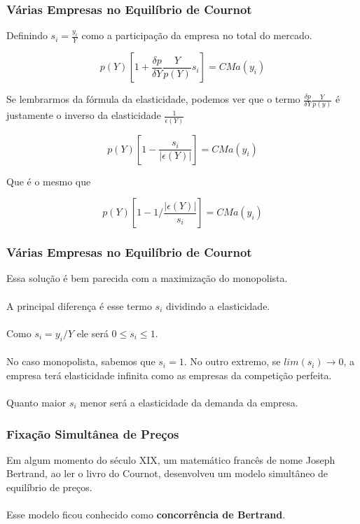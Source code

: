 \documentclass{beamer}[10]
\begin{document}
\begin{frame}
	\frametitle{Várias Empresas no Equilíbrio de Cournot}

	Definindo $s_i = \frac{y_i}{Y}$ como a participação da empresa no total do mercado.

	$$ p(Y) \left[1 + \frac{\delta p}{\delta Y} \frac{Y}{p(Y)} s_i \right] = CMa(y_i) $$

	Se lembrarmos da fórmula da elasticidade, podemos ver que o termo $\frac{\delta p}{\delta Y} \frac{Y}{p(y)}$ é justamente o inverso da elasticidade $\frac{1}{\epsilon(Y)}$

	$$ p(Y) \left[1 - \frac{s_i}{|\epsilon(Y)|} \right] = CMa(y_i) $$

	Que é o mesmo que

	$$ p(Y) \left[1 - 1/\frac{|\epsilon(Y)|}{s_i} \right] = CMa(y_i) $$

\end{frame}

\begin{frame}
	\frametitle{Várias Empresas no Equilíbrio de Cournot}

	Essa solução é bem parecida com a maximização do monopolista. 
	\\~\\
	A principal diferença é esse termo $s_i$ dividindo a elasticidade. 
	\\~\\
	Como $s_i = y_i/Y$ ele será $0 \leq s_i \leq 1$. 
	\\~\\
	No caso monopolista, sabemos que $s_i = 1$. No outro extremo, se $lim (s_i) \rightarrow 0$, a empresa terá elasticidade infinita como as empresas da competição perfeita.
	\\~\\
	Quanto maior $s_i$ menor será a elasticidade da demanda da empresa.
\end{frame}

\begin{frame}
	\frametitle{Fixação Simultânea de Preços}

	Em algum momento do século XIX, um matemático francês de nome Joseph Bertrand, ao ler o livro do Cournot, desenvolveu um modelo simultâneo de equilíbrio de preços. 
	\\~\\
	Esse modelo ficou conhecido como \textbf{concorrência de Bertrand}.

\end{frame}
\end{document}
